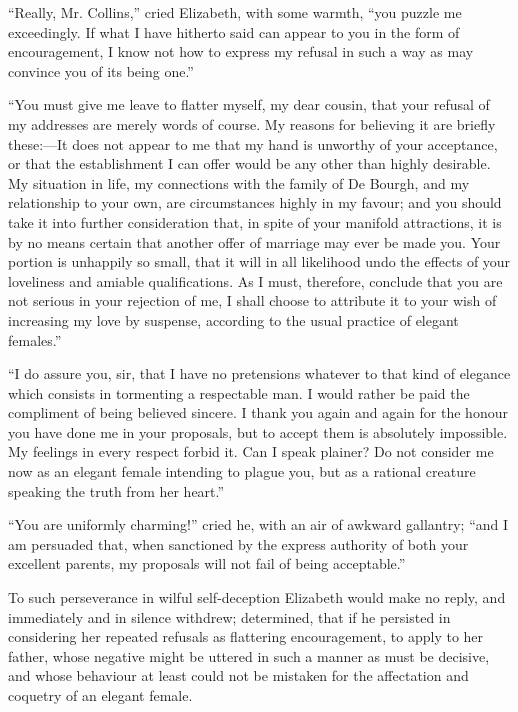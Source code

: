 \documentclass[12pt]{book}
\begin{document}
``Really, Mr. Collins,'' cried Elizabeth, with some warmth, ``you puzzle me exceedingly. If what I have hitherto said can appear to you in the form of encouragement, I know not how to express my refusal in such a way as may convince you of its being one.''

``You must give me leave to flatter myself, my dear cousin, that your refusal of my addresses are merely words of course. My reasons for believing it are briefly these:---It does not appear to me that my hand is unworthy of your acceptance, or that the establishment I can offer would be any other than highly desirable. My situation in life, my connections with the family of De Bourgh, and my relationship to your own, are circumstances highly in my favour; and you should take it into further consideration that, in spite of your manifold attractions, it is by no means certain that another offer of marriage may ever be made you. Your portion is unhappily so small, that it will in all likelihood undo the effects of your loveliness and amiable qualifications. As I must, therefore, conclude that you are not serious in your rejection of me, I shall choose to attribute it to your wish of increasing my love by suspense, according to the usual practice of elegant females.''

``I do assure you, sir, that I have no pretensions whatever to that kind of elegance which consists in tormenting a respectable man. I would rather be paid the compliment of being believed sincere. I thank you again and again for the honour you have done me in your proposals, but to accept them is absolutely impossible. My feelings in every respect forbid it. Can I speak plainer? Do not consider me now as an elegant female intending to plague you, but as a rational creature speaking the truth from her heart.''

``You are uniformly charming!'' cried he, with an air of awkward gallantry; ``and I am persuaded that, when sanctioned by the express authority of both your excellent parents, my proposals will not fail of being acceptable.''

To such perseverance in wilful self-deception Elizabeth would make no reply, and immediately and in silence withdrew; determined, that if he persisted in considering her repeated refusals as flattering encouragement, to apply to her father, whose negative might be uttered in such a manner as must be decisive, and whose behaviour at least could not be mistaken for the affectation and coquetry of an elegant female.
\end{document}
